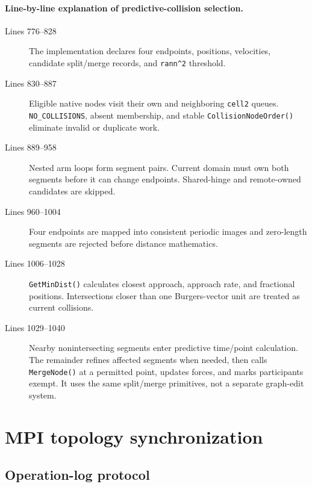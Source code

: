 \documentclass[11pt]{article}
\newcommand{\code}[1]{\texorpdfstring{\nolinkurl{#1}}{#1}}
\begin{document}
\paragraph{Line-by-line explanation of predictive-collision selection.}
\begin{description}
\item[Lines 776--828] The implementation declares four endpoints, positions,
velocities, candidate split/merge records, and \code{rann^2} threshold.
\item[Lines 830--887] Eligible native nodes visit their own and neighboring
\code{cell2} queues. \code{NO_COLLISIONS}, absent membership, and stable
\code{CollisionNodeOrder()} eliminate invalid or duplicate work.
\item[Lines 889--958] Nested arm loops form segment pairs. Current domain
must own both segments before it can change endpoints. Shared-hinge and
remote-owned candidates are skipped.
\item[Lines 960--1004] Four endpoints are mapped into consistent periodic
images and zero-length segments are rejected before distance mathematics.
\item[Lines 1006--1028] \code{GetMinDist()} calculates closest approach,
approach rate, and fractional positions. Intersections closer than one
Burgers-vector unit are treated as current collisions.
\item[Lines 1029--1040] Nearby nonintersecting segments enter predictive
time/point calculation. The remainder refines affected segments when needed,
then calls \code{MergeNode()} at a permitted point, updates forces, and marks
participants exempt. It uses the same split/merge primitives, not a separate
graph-edit system.
\end{description}

\section{MPI topology synchronization}

\subsection{Operation-log protocol}






\end{document}
